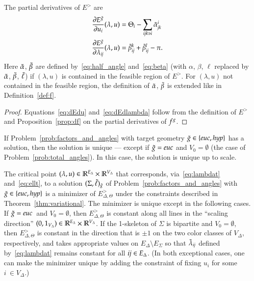 \documentclass[Thesis]{subfiles}
\begin{document}
\begin{proposition}
  \label{prop:dE}
  The partial derivatives of $E^{\gt}$ are
  \begin{align}
    \label{eq:dEdu}
    \frac{\partial E^{\tilde{g}}}{\partial u_i}(\lambda,u) &= \Theta_i - \sum_{{\it
      ijk}\ni i}\tilde{\alpha}_{\it jk}^i \\
    \label{eq:dEdlambda}
    \frac{\partial E^{\tilde{g}}}{\partial \lambda_{\it ij}}(\lambda,u) &= \tilde{\beta}_{\it ij}^k + \tilde{\beta}_{\it ij}^l -\pi.
  \end{align}
  Here $\tilde{\alpha}$, $\tilde{\beta}$ are defined by~\eqref{eq:half_angle}
  and~\eqref{eq:beta} (with $\alpha$, $\beta$, $\ell$ replaced by
  $\tilde{\alpha}$, $\tilde{\beta}$, $\tilde{\ell}$) if\/ $(\lambda,u)$ is contained in the
  feasible region of $E^{\gt}$. For\/ $(\lambda,u)$ not contained in
  the feasible region, the definition of $\tilde{\alpha}$, $\tilde{\beta}$ is
  extended like in Definition~\ref{def:f}.
\end{proposition}

\begin{proof}
  Equations~\eqref{eq:dEdu} and~\eqref{eq:dEdlambda} follow from the
  definition of $E^{\gt}$ and Proposition~\ref{prop:df} on the partial
  derivatives of $f^{g}$.
\end{proof}

\begin{theorem}
  \label{thm:uniqueness}
  If Problem~\ref{prob:factors_and_angles} with target geometry 
  $\gt\in\{\euc,\hyp\}$
  has a solution, then the solution is unique --- except if $\gt=\euc$
  and $V_{0}=\emptyset$ (the case of
  Problem~\ref{prob:total_angles}). In this case, the solution is
  unique up to scale.

  The critical point\/ $(\lambda,
  u)\in\mathbb R^{E_{\Delta}}\times\mathbb R^{V_{\Delta}}$ that corresponds,
  via~\eqref{eq:lambdat} and~\eqref{eq:ellt}, to a solution
  $(\Sigma,\tilde{\ell})_{\tilde{g}}$ of Problem~\ref{prob:factors_and_angles} with
  $\gt\in\{\euc,\hyp\}$ is a minimizer of $E^{\gt}_{\Delta,\Theta}$
  under the constraints described in
  Theorem~\ref{thm:variational}. The minimizer is unique except in the
  following cases. If $\gt=\euc$\, and $V_{0}=\emptyset$, then
  $E^{\gt}_{\Delta,\Theta}$ is constant along all lines in the
  ``scaling direction''
  $(0,1_{V_{\Delta}})\in\mathbb R^{E_{\Delta}}\times\mathbb R^{V_{\Delta}}$. If the
  1-skeleton of\/ $\Sigma$ is bipartite and $V_{0}=\emptyset$, then
  $E^{\gt}_{\Delta,\Theta}$ is constant in the direction that is $\pm
  1$ on the two color classes of $V_{\Delta}$, respectively, and takes
  appropriate values on $E_{\Delta}\setminus E_{\Sigma}$ so that
  $\tilde{\lambda}_{\it ij}$ defined by~\eqref{eq:lambdat} remains constant
  for all ${\it ij}\in E_{\Delta}$. (In both exceptional cases, one
  can make the minimizer unique by adding the constraint of fixing
  $u_{i}$ for some $i~\in V_{\Delta}$.)
\end{theorem}
\end{document}

